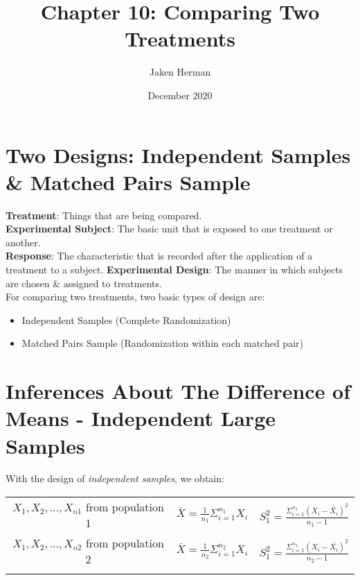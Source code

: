 \documentclass{article}
\title{Chapter 10: Comparing Two Treatments}
\author{Jaken Herman }
\date{December 2020}
\begin{document}
\maketitle

\section{Two Designs: Independent Samples \& Matched Pairs Sample}
\textbf{Treatment}: Things that are being compared. \\
\textbf{Experimental Subject}: The basic unit that is exposed to one treatment or another. \\
\textbf{Response}: The characteristic that is recorded after the application of a treatment to a subject.
\textbf{Experimental Design}: The manner in which subjects are chosen \& assigned to treatments. \\

For comparing two treatments, two basic types of design are:
\begin{itemize}
    \item{Independent Samples (Complete Randomization)}
    \item{Matched Pairs Sample (Randomization within each matched pair)}
\end{itemize}

\break

\section{Inferences About The Difference of Means - Independent Large Samples}
With the design of \textit{independent samples}, we obtain:

\begin{mdframed}
\begin{center}
\begin{tabular}{ c c c }
 \(X_1, X_2, ..., X_{n1}\) from population 1 & \(\bar{X} = \frac{1}{n_1}\Sigma_{i=1}^{n_1}X_i\) & \(S_1^2=\frac{\Sigma_{i=1}^{n_1}(X_i - \bar{X_i})^2}{n_1 - 1}\) \\ 
 \(X_1, X_2, ..., X_{n2}\) from population 2 & \(\bar{X} = \frac{1}{n_2}\Sigma_{i=1}^{n_2}X_i\) & \(S_1^2=\frac{\Sigma_{i=1}^{n_2}(X_i - \bar{X_i})^2}{n_2 - 1}\) \\ 
 \(\) & \(\) & \(\)    
\end{tabular}
\end{center}
\end{mdframed}
\end{document}
